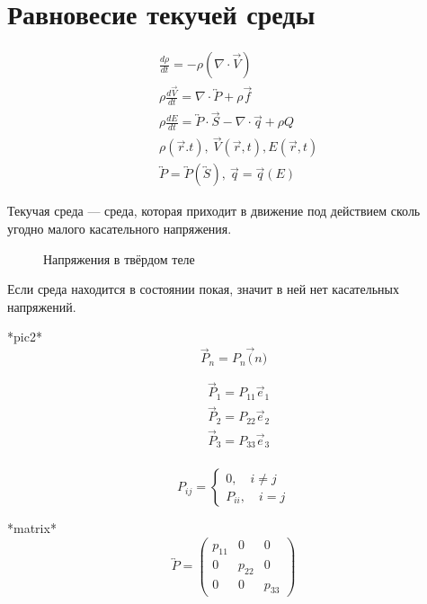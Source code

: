 \section{Равновесие текучей среды}
\begin{align*}
  &\frac{d\rho}{dt} = -\rho(\nabla \cdot \vec{V}) \\
  &\rho \frac{d \vec{V}}{dt} = \nabla \cdot \overleftrightarrow{P} + \rho \vec{f} \\
  & \rho \frac{d E}{dt} = \overleftrightarrow{P} \cdot \vec{S} - \nabla \cdot \vec{q} + \rho Q \\
  &\rho(\vec{r}. t),\ \vec{V}(\vec{r}, t), E(\vec{r}, t) \\
  &\overleftrightarrow{P} = \overleftrightarrow{P} (\overleftrightarrow{S}),\ \vec{q} = \vec{q}(E)
\end{align*}

\begin{defn}
  Текучая среда --- среда, которая приходит в движение под действием сколь
  угодно малого касательного напряжения.
\end{defn}

\begin{figure}[h]
    \centering
    
    \caption{Напряжения в твёрдом теле}
\end{figure}

\begin{note}
  Если среда находится в состоянии покая, значит в ней нет касательных напряжений.
\end{note}

*pic2*
\[
  \vec{P}_n = P_n \vec(n)
\]

\begin{align*}
  &\vec{P}_1 = P_{11} \vec{e}_1 \\
  &\vec{P}_2 = P_{22} \vec{e}_2 \\
  &\vec{P}_3 = P_{33} \vec{e}_3 \\
\end{align*}

\[
  P_{ij} = \begin{cases}
    0, \quad i \neq j \\
    P_{ii}, \quad i = j
  \end{cases}
\]

*matrix*
\[
  \overleftrightarrow{P} =
  \begin{pmatrix}
    p_{11} &0 &0 \\
    0 &p_{22} &0 \\
    0 &0 &p_{33}
  \end{pmatrix}
\]

